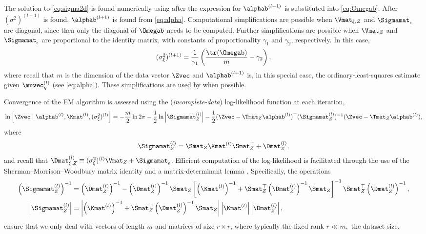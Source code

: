 \noindent The solution to \eqref{eq:sigma2d} is found numerically using  after the expression for $\alphab^{(l+1)}$ is substituted into \eqref{eq:Omegab}. After $ (\sigma^2)^{(l+1)}$ is found, $\alphab^{(l+1)}$ is found from \eqref{eq:alpha}. Computational simplifications are possible when $\Vmat_{\xi,Z}$ and $\Sigmamat_\epsilon$ are diagonal, since then only the diagonal of $\Omegab$ needs to be computed. Further simplifications are possible when $\Vmat_Z$ and $\Sigmamat_\epsilon$ are proportional to the identity matrix, with constants of proportionality $\gamma_1$ and $\gamma_2$, respectively. In this case,
\begin{equation*}
(\sigma^2_\xi)^{(l+1)} = \frac{1}{\gamma_1} \left(\frac{\tr(\Omegab)}{m} - \gamma_2 \right),
\end{equation*}
where recall that $m$ is the dimension of the data vector $\Zvec$ and $\alphab^{(l+1)}$ is, in this special case, the ordinary-least-squares estimate given $\muvec_\eta^{(l)}$ (see \eqref{eq:alpha}). These simplifications are used by  when possible.

Convergence of the EM algorithm is assessed using the (\emph{incomplete-data}) log-likelihood function at each iteration,
\begin{equation*}
\ln \left[\Zvec \mid \alphab^{(l)}, \Kmat^{(l)}, (\sigma^2_\xi)^{(l)}\right] = -\frac{m}{2}\ln 2\pi -\frac{1}{2}\ln \left|\Sigmamat_Z^{(l)}\right| - \frac{1}{2}(\Zvec - \Tmat_Z\alphab^{(l)})^\top(\Sigmamat_Z^{(l)})^{-1}(\Zvec - \Tmat_Z\alphab^{(l)}),
\end{equation*}
where
\begin{equation*}
\Sigmamat_Z^{(l)} = \Smat_Z \Kmat^{(l)} \Smat_Z^\top + \Dmat_Z^{(l)},
\end{equation*}
and recall that $\Dmat_{\xi,Z}^{(l)} \equiv (\sigma_\xi^2)^{(l)}\Vmat_Z + \Sigmamat_\epsilon$. Efficient computation of the log-likelihood is facilitated through the use of the Sherman--Morrison--Woodbury matrix identity and a matrix-determinant lemma \citep[e.g.,][]{Henderson_1981}. Specifically, the operations
\begin{align*}
\left(\Sigmamat_Z^{(l)}\right)^{-1} &= \left(\Dmat_Z^{(l)}\right)^{-1} - \left(\Dmat_Z^{(l)}\right)^{-1} \Smat_Z \left[\left(\Kmat^{(l)}\right)^{-1} + \Smat^\top_Z \left(\Dmat_Z^{(l)}\right)^{-1}\Smat_Z\right]^{-1}\Smat_Z^\top\left(\Dmat_Z^{(l)}\right)^{-1},\\
\left| \Sigmamat_Z^{(l)}  \right| &= \left| \left(\Kmat^{(l)}\right)^{-1} + \Smat_Z^\top\left(\Dmat_Z^{(l)}\right)^{-1} \Smat_Z \right| \left|\Kmat^{(l)} \right| \left|\Dmat_Z^{(l)}\right|,%
\end{align*}
ensure that we only deal with vectors of length $m$ and matrices of size $r \times r$, where typically the fixed rank $r \ll m,$ the dataset size.

